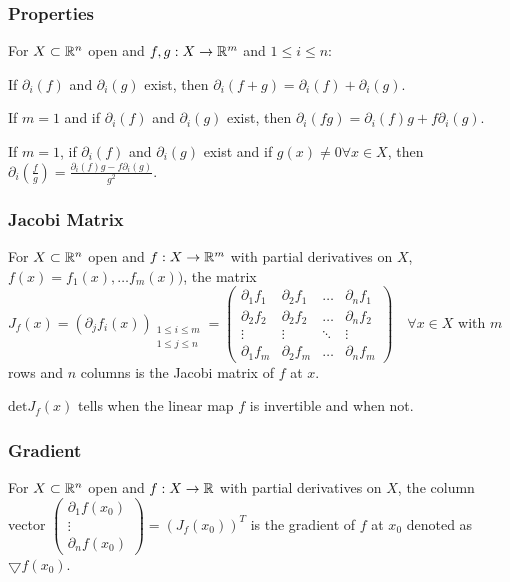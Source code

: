 \subsubsection{Properties}
For $X \subset \mathbb{R}^n$ open and $f, g: X \to \mathbb{R}^m$ and $1 \le i \le n$:
\begin{compactitem}
    \item If $\partial_i (f)$ and $\partial_i (g)$ exist, then $\partial_i (f + g) = \partial_i (f) + \partial_i (g)$.
    \item If $m = 1$ and if $\partial_i (f)$ and $\partial_i (g)$ exist, then $\partial_i (fg) = \partial_i (f)g + f \partial_i (g)$.
    \item If $m = 1$, if $\partial_i (f)$ and $\partial_i (g)$ exist and if $g(x) \neq 0 \forall x \in X$, then $\partial_i (\frac{f}{g}) = \frac{\partial_i (f)g - f \partial_i (g)}{g^2}$.
\end{compactitem}

\subsubsection{Jacobi Matrix}
For $X \subset \mathbb{R}^n$ open and $f: X \to \mathbb{R}^m$ with partial derivatives on $X$, $f(x) = f_1(x), \dots f_m(x))$, the matrix $J_f(x) = (\partial_j f_i(x))_{\substack{1 \le i \le m\\1 \le j \le n}} =
    \begin{pmatrix}
        \partial_1 f_1 & \partial_2 f_1 & \dots & \partial_n f_1\\
        \partial_2 f_2 & \partial_2 f_2 & \dots & \partial_n f_2\\
        \vdots & \vdots & \ddots & \vdots \\
        \partial_1 f_m & \partial_2 f_m & \dots & \partial_n f_m
    \end{pmatrix}
\quad \forall x \in X$ with $m$ rows and $n$ columns is the Jacobi matrix of $f$ at $x$.

\begin{compactitem}
    \item $\text{det} J_f(x)$ tells when the linear map $f$ is invertible and when not.
\end{compactitem}

\subsubsection{Gradient}
For $X \subset \mathbb{R}^n$ open and $f: X \to \mathbb{R}$ with partial derivatives on $X$, the column vector $
\begin{pmatrix}
    \partial_1 f(x_0)\\
    \vdots\\
    \partial_n f(x_0)
\end{pmatrix}
= (J_f(x_0))^T$ is the gradient of $f$ at $x_0$ denoted as $\bigtriangledown f(x_0)$.

